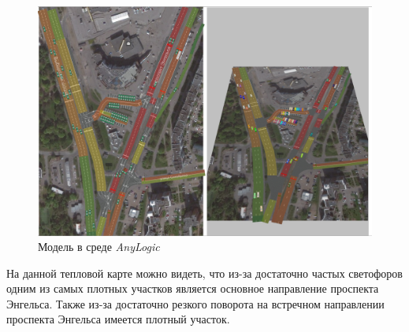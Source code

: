 \documentclass[14pt,fleqn]{extarticle}
\begin{document}
	\begin{figure}[h]
		\centering \includegraphics[scale=0.3]{road_visualization}
		\caption{Модель в среде \textit{AnyLogic}}
		\label{fig:road_visualization}
	\end{figure}

	На данной тепловой карте можно видеть, что из-за достаточно частых светофоров одним из самых плотных участков является основное направление проспекта Энгельса. Также из-за достаточно резкого поворота на встречном направлении проспекта Энгельса имеется плотный участок.
\end{document}

